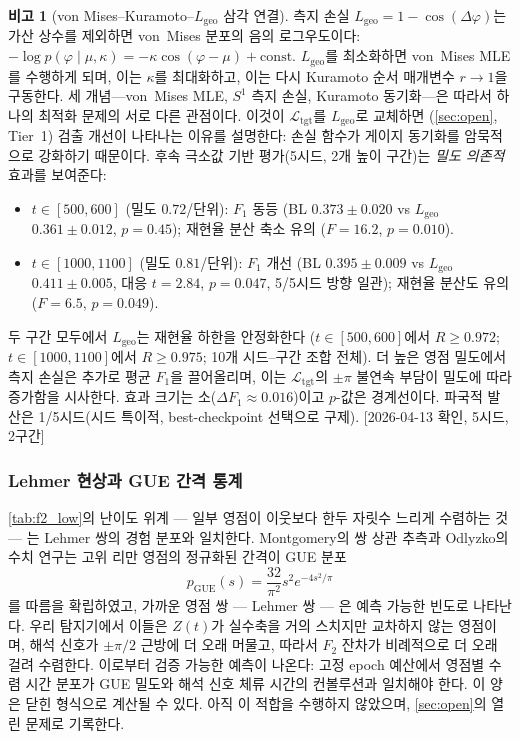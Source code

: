 \documentclass[11pt, a4paper]{article}
\theoremstyle{definition}
\newtheorem{remark}{비고}[section]
\theoremstyle{plain}
\newcommand{\Ltgt}{\mathcal{L}_{\mathrm{tgt}}}
\begin{document}
\begin{remark}[von Mises--Kuramoto--$L_{\mathrm{geo}}$ 삼각 연결]
\label{rem:triangle}
측지 손실 $L_{\mathrm{geo}} = 1 - \cos(\Delta\varphi)$는
가산 상수를 제외하면 von~Mises 분포의 음의 로그우도이다:
$-\log p(\varphi \mid \mu,\kappa)
  = -\kappa\cos(\varphi-\mu) + \mathrm{const}$.
$L_{\mathrm{geo}}$를 최소화하면 von~Mises MLE를 수행하게 되며,
이는 $\kappa$를 최대화하고, 이는 다시 Kuramoto
순서 매개변수 $r \to 1$을 구동한다. 세 개념---von~Mises MLE,
$S^1$ 측지 손실, Kuramoto 동기화---은 따라서 하나의
최적화 문제의 서로 다른 관점이다. 이것이
$\Ltgt$를 $L_{\mathrm{geo}}$로 교체하면
(\cref{sec:open}, Tier~1) 검출 개선이 나타나는 이유를
설명한다: 손실 함수가 게이지 동기화를 암묵적으로
강화하기 때문이다.
후속 극소값 기반 평가(5시드, 2개 높이 구간)는
\emph{밀도 의존적} 효과를 보여준다:
\begin{itemize}
  \item \textbf{$t\in[500,600]$} (밀도 $0.72$/단위):
    $F_1$ 동등 (BL $0.373\pm0.020$ vs $L_{\mathrm{geo}}$
    $0.361\pm0.012$, $p{=}0.45$);
    재현율 분산 축소 유의
    ($F{=}16.2$, $p{=}0.010$).
  \item \textbf{$t\in[1000,1100]$} (밀도 $0.81$/단위):
    $F_1$ 개선 (BL $0.395\pm0.009$ vs $L_{\mathrm{geo}}$
    $0.411\pm0.005$, 대응 $t{=}2.84$, $p{=}0.047$,
    5/5시드 방향 일관);
    재현율 분산도 유의 ($F{=}6.5$, $p{=}0.049$).
\end{itemize}
두 구간 모두에서 $L_{\mathrm{geo}}$는 재현율 하한을
안정화한다 ($t\in[500,600]$에서 $R\ge 0.972$;
$t\in[1000,1100]$에서 $R\ge 0.975$; 10개
시드--구간 조합 전체).
더 높은 영점 밀도에서 측지 손실은 추가로 평균 $F_1$을
끌어올리며, 이는 $\Ltgt$의 $\pm\pi$ 불연속 부담이
밀도에 따라 증가함을 시사한다.
효과 크기는 소($\Delta F_1 \approx 0.016$)이고
$p$-값은 경계선이다.
파국적 발산은 1/5시드(시드 특이적, best-checkpoint
선택으로 구제).
[2026-04-13 확인, 5시드, 2구간]
\end{remark}

\subsubsection{Lehmer 현상과 GUE 간격 통계}
\label{sec:lehmer_gue}

\cref{tab:f2_low}의 난이도 위계 --- 일부 영점이 이웃보다 한두 자릿수 느리게 수렴하는 것 --- 는 Lehmer 쌍의 경험 분포와 일치한다. Montgomery의 쌍 상관 추측과 Odlyzko의 수치 연구는 고위 리만 영점의 정규화된 간격이 GUE 분포
\begin{equation}\label{eq:gue}
  p_{\mathrm{GUE}}(s) = \frac{32}{\pi^2}s^2 e^{-4s^2/\pi}
\end{equation}
를 따름을 확립하였고, 가까운 영점 쌍 --- Lehmer 쌍 --- 은 예측 가능한 빈도로 나타난다. 우리 탐지기에서 이들은 $Z(t)$가 실수축을 거의 스치지만 교차하지 않는 영점이며, 해석 신호가 $\pm\pi/2$ 근방에 더 오래 머물고, 따라서 $F_2$ 잔차가 비례적으로 더 오래 걸려 수렴한다. 이로부터 검증 가능한 예측이 나온다: 고정 epoch 예산에서 영점별 수렴 시간 분포가 GUE 밀도와 해석 신호 체류 시간의 컨볼루션과 일치해야 한다. 이 양은 닫힌 형식으로 계산될 수 있다. 아직 이 적합을 수행하지 않았으며, \cref{sec:open}의 열린 문제로 기록한다.
\end{document}
